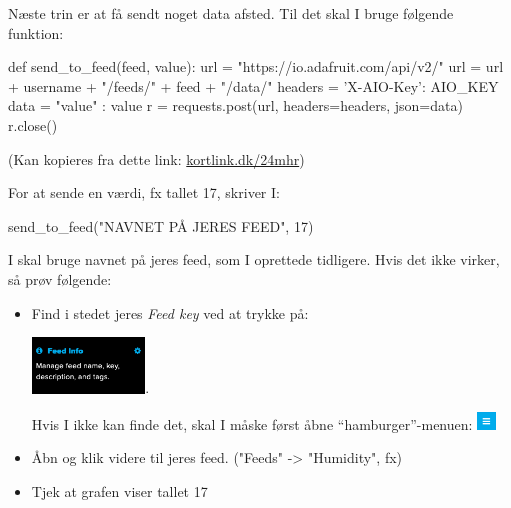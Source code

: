 \documentclass{ucph-handout}
\begin{document}
\begin{exercisebox}[adjusted title=Send data til Adafruit IO]
Næste trin er at få sendt noget data afsted. Til det skal I bruge følgende funktion:
\begin{python}
def send_to_feed(feed, value):
    url = "https://io.adafruit.com/api/v2/"
    url = url + username + "/feeds/" + feed + "/data/"
    headers = {'X-AIO-Key': AIO_KEY}
    data = { "value" : value }
    r = requests.post(url, headers=headers, json=data)
    r.close()
\end{python}
(Kan kopieres fra dette link: \url{kortlink.dk/24mhr})

\vspace{2mm}
For at sende en værdi, fx tallet 17, skriver I:

\begin{python}
send_to_feed("NAVNET PÅ JERES FEED", 17)
\end{python}

I skal bruge navnet på jeres feed, som I oprettede tidligere. Hvis det
ikke virker, så prøv følgende:
\vspace{-1mm}
\begin{itemize}
 \item Find i stedet jeres \textit{Feed key} ved at trykke på:

  \quad\includegraphics[width=3cm]{illustrationer/adafruit_feedinfo}.
  
  Hvis I ikke kan finde det, skal I måske først åbne "`hamburger"'-menuen: \includegraphics[width=5mm]{illustrationer/adafruit_hamburger}
\end{itemize}


\begin{itemize}
\item Åbn  og klik videre til jeres feed. ("Feeds" -> "Humidity", fx)
\item Tjek at grafen viser tallet 17
  \vspace{-1mm}
\end{itemize}
\end{exercisebox}
\end{document}
